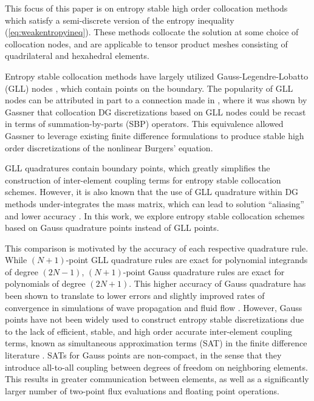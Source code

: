 \documentclass[review,onefignum,onetabnum,final]{siamart171218}
\begin{document}
This focus of this paper is on entropy stable high order collocation methods which satisfy a semi-discrete version of the entropy inequality (\ref{eq:weakentropyineq}).  These methods collocate the solution at some choice of collocation nodes, and are applicable to tensor product meshes consisting of quadrilateral and hexahedral elements.  

Entropy stable collocation methods have largely utilized Gauss-Legendre-Lobatto (GLL) nodes \cite{fisher2013high, carpenter2014entropy, gassner2016split, gassner2017br1}, which contain points on the boundary.  The popularity of GLL nodes can be attributed in part to a connection made in \cite{gassner2013skew}, where it was shown by Gassner that collocation DG discretizations based on GLL nodes could be recast in terms of summation-by-parts (SBP) operators.  This equivalence allowed Gassner to leverage existing finite difference formulations to produce stable high order discretizations of the nonlinear Burgers' equation.  

GLL quadratures contain boundary points, which greatly simplifies the construction of inter-element coupling terms for entropy stable collocation schemes.  However, it is also known that the use of GLL quadrature within DG methods under-integrates the mass matrix, which can lead to solution ``aliasing'' and lower accuracy \cite{parsani2016entropy}.  In this work, we explore entropy stable collocation schemes based on Gauss quadrature points instead of GLL points.  

This comparison is motivated by the accuracy of each respective quadrature rule.  While $(N+1)$-point GLL quadrature rules are exact for polynomial integrands of degree $(2N-1)$, $(N+1)$-point Gauss quadrature rules are exact for polynomials of degree $(2N+1)$.  This higher accuracy of Gauss quadrature has been shown to translate to lower errors and slightly improved rates of convergence in simulations of wave propagation and fluid flow \cite{kopriva2010quadrature, hindenlang2012explicit, chan2015gpu}.  However, Gauss points have not been widely used to construct entropy stable discretizations due to the lack of efficient, stable, and high order accurate inter-element coupling terms, known as simultaneous approximation terms (SAT) in the finite difference literature \cite{fernandez2014review, crean2017high, fernandez2018simultaneous}.  SATs for Gauss points are non-compact, in the sense that they introduce all-to-all coupling between degrees of freedom on neighboring elements.  This results in greater communication between elements, as well as a significantly larger number of two-point flux evaluations and floating point operations.  
\end{document}
